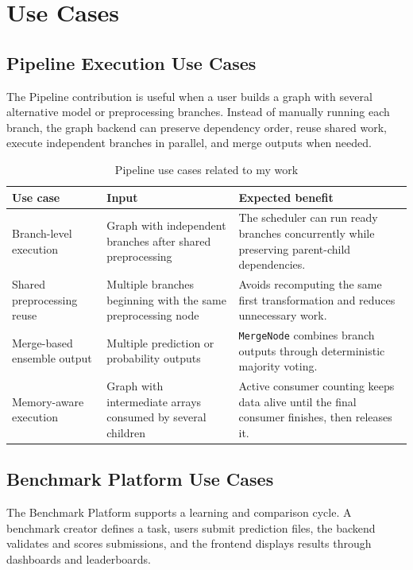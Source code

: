 \documentclass[12pt,a4paper,oneside]{report}
\newcommand{\modulepath}[1]{\texttt{#1}}
\begin{document}
\chapter{Use Cases}
\label{chap:individual-use-cases}

\section{Pipeline Execution Use Cases}
The Pipeline contribution is useful when a user builds a graph with several alternative model or preprocessing branches. Instead of manually running each branch, the graph backend can preserve dependency order, reuse shared work, execute independent branches in parallel, and merge outputs when needed.

\begin{table}[H]
\centering
\small
\caption{Pipeline use cases related to my work}
\label{tab:pipeline-use-cases-individual}
\begin{tabularx}{\textwidth}{p{}p{}X}
\toprule
\textbf{Use case} & \textbf{Input} & \textbf{Expected benefit} \\
\midrule
Branch-level execution &
Graph with independent branches after shared preprocessing &
The scheduler can run ready branches concurrently while preserving parent-child dependencies. \\
\midrule
Shared preprocessing reuse &
Multiple branches beginning with the same preprocessing node &
Avoids recomputing the same first transformation and reduces unnecessary work. \\
\midrule
Merge-based ensemble output &
Multiple prediction or probability outputs &
\modulepath{MergeNode} combines branch outputs through deterministic majority voting. \\
\midrule
Memory-aware execution &
Graph with intermediate arrays consumed by several children &
Active consumer counting keeps data alive until the final consumer finishes, then releases it. \\
\bottomrule
\end{tabularx}
\end{table}

\section{Benchmark Platform Use Cases}
The Benchmark Platform supports a learning and comparison cycle. A benchmark creator defines a task, users submit prediction files, the backend validates and scores submissions, and the frontend displays results through dashboards and leaderboards.
\end{document}
